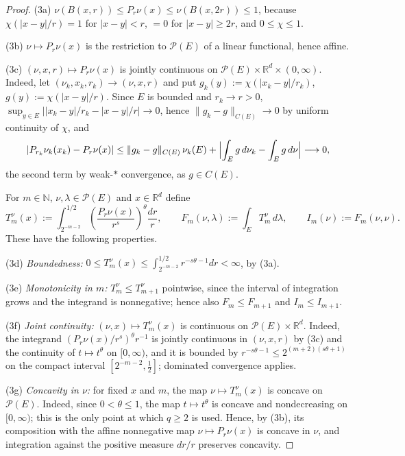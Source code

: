 \documentclass[12pt,oneside,a4paper]{article}
\theoremstyle{mytheorem}
\theoremstyle{remark}
\theoremstyle{definition}
\begin{document}
\begin{proof}
\textup{(3a)} $\nu(B(x,r))\le P_r\nu(x)\le\nu(B(x,2r))\le1$, because
$\chi(|x-y|/r)=1$ for $|x-y|<r$, $=0$ for $|x-y|\ge2r$, and
$0\le\chi\le1$.

\textup{(3b)} $\nu\mapsto P_r\nu(x)$ is the restriction to
$\mathcal{P}(E)$ of a linear functional, hence affine.

\textup{(3c)} $(\nu,x,r)\mapsto P_r\nu(x)$ is jointly continuous on
$\mathcal{P}(E)\times\mathbb{R}^d\times(0,\infty)$.  Indeed, let
$(\nu_k,x_k,r_k)\to(\nu,x,r)$ and put $g_k(y):=\chi(|x_k-y|/r_k)$,
$g(y):=\chi(|x-y|/r)$.  Since $E$ is bounded and $r_k\to r>0$,
$\sup_{y\in E}\bigl||x_k-y|/r_k-|x-y|/r\bigr|\to0$, hence
$\|g_k-g\|_{C(E)}\to0$ by uniform continuity of $\chi$, and
\[
 |P_{r_k}\nu_k(x_k)-P_r\nu(x)|
 \le\|g_k-g\|_{C(E)}\,\nu_k(E)
 +\Bigl|\int_Eg\,d\nu_k-\int_Eg\,d\nu\Bigr|\longrightarrow0,
\]
the second term by weak-\(*\) convergence, as $g\in C(E)$.

For $m\in\mathbb{N}$, $\nu,\lambda\in\mathcal{P}(E)$ and
$x\in\mathbb{R}^d$ define
\[
 T^\nu_m(x):=\int_{2^{-m-2}}^{1/2}
 \left(\frac{P_r\nu(x)}{r^s}\right)^{\theta}\frac{dr}{r},
 \qquad
 F_m(\nu,\lambda):=\int_ET^\nu_m\,d\lambda,
 \qquad
 I_m(\nu):=F_m(\nu,\nu).
\]
These have the following properties.

\textup{(3d)} \emph{Boundedness:}
$0\le T^\nu_m(x)\le\int_{2^{-m-2}}^{1/2}r^{-s\theta-1}dr<\infty$, by
(3a).

\textup{(3e)} \emph{Monotonicity in $m$:} $T^\nu_m\le T^\nu_{m+1}$
pointwise, since the interval of integration grows and the integrand
is nonnegative; hence also $F_m\le F_{m+1}$ and $I_m\le I_{m+1}$.

\textup{(3f)} \emph{Joint continuity:} $(\nu,x)\mapsto T^\nu_m(x)$ is
continuous on $\mathcal{P}(E)\times\mathbb{R}^d$.  Indeed, the integrand
$(P_r\nu(x)/r^s)^\theta r^{-1}$ is jointly continuous in $(\nu,x,r)$ by
(3c) and the continuity of $t\mapsto t^\theta$ on $[0,\infty)$, and it
is bounded by $r^{-s\theta-1}\le2^{(m+2)(s\theta+1)}$ on the compact
interval $[2^{-m-2},\tfrac12]$; dominated convergence applies.

\textup{(3g)} \emph{Concavity in $\nu$:} for fixed $x$ and $m$, the map
$\nu\mapsto T^\nu_m(x)$ is concave on $\mathcal{P}(E)$.  Indeed, since $0<\theta\leq1$, the map $t\mapsto t^\theta$ is concave and nondecreasing on $[0,\infty)$; this is the only point at which $q\geq2$ is used. Hence, by (3b), its composition with the affine nonnegative map $\nu\mapsto P_r\nu(x)$ is concave in $\nu$, and integration against the positive measure $dr/r$ preserves concavity.


\end{proof}
\end{document}
